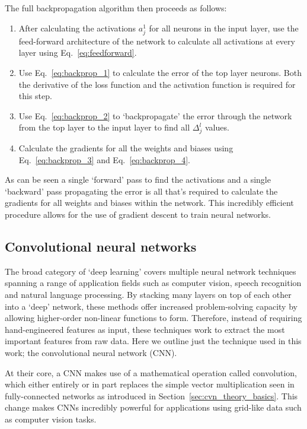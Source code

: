 The full backpropagation algorithm then proceeds as follows:
\begin{enumerate}
    \item After calculating the activations $a^{1}_{j}$ for all neurons in the input layer, use
          the feed-forward architecture of the network to calculate all activations at every layer
          using Eq.~\ref{eq:feedforward}.
    \item Use Eq.~\ref{eq:backprop_1} to calculate the error of the top layer neurons. Both the
          derivative of the loss function and the activation function is required for this step.
    \item Use Eq.~\ref{eq:backprop_2} to `backpropagate' the error through the network from the
          top layer to the input layer to find all $\Delta^{l}_{j}$ values.
    \item Calculate the gradients for all the weights and biases using Eq.~\ref{eq:backprop_3} and
          Eq.~\ref{eq:backprop_4}.
\end{enumerate}
As can be seen a single `forward' pass to find the activations and a single `backward' pass
propagating the error is all that's required to calculate the gradients for all weights and
biases within the network. This incredibly efficient procedure allows for the use of gradient
descent to train neural networks.

\subsection{Convolutional neural networks} %
\label{sec:cvn_theory_conv} %

The broad category of `deep learning' covers multiple neural network techniques spanning a range
of application fields such as computer vision, speech recognition and natural language processing.
By stacking many layers on top of each other into a `deep' network, these methods offer increased
problem-solving capacity by allowing higher-order non-linear functions to form. Therefore, instead
of requiring hand-engineered features as input, these techniques work to extract the most
important features from raw data. Here we outline just the technique used in this work; the
convolutional neural network (CNN).

At their core, a CNN makes use of a mathematical operation called convolution, which either
entirely or in part replaces the simple vector multiplication seen in fully-connected networks as
introduced in Section~\ref{sec:cvn_theory_basics}. This change makes CNNs incredibly powerful for
applications using grid-like data such as computer vision tasks.

